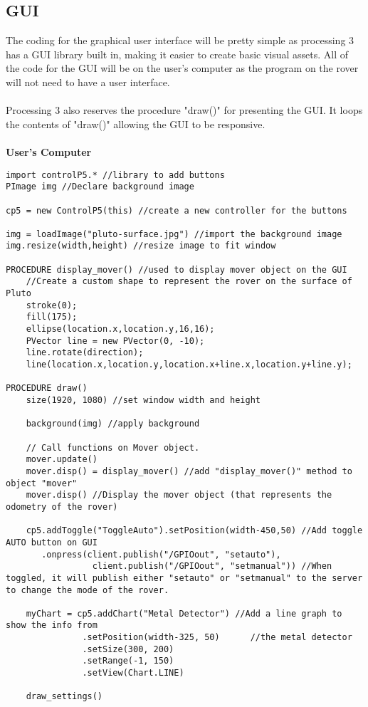 \documentclass[11pt]{report}
\begin{document}
\subsection{GUI}
The coding for the graphical user interface will be pretty simple as processing 3 has a GUI library built in, making it easier to create basic visual assets. All of the code for the GUI will be on the user's computer as the program on the rover will not need to have a user interface. 
\\\\
Processing 3 also reserves the procedure "draw()" for presenting the GUI. It loops the contents of "draw()" allowing the GUI to be responsive.
\\\\
\textbf{User's Computer}
\begin{lstlisting}
import controlP5.* //library to add buttons
PImage img //Declare background image

cp5 = new ControlP5(this) //create a new controller for the buttons

img = loadImage("pluto-surface.jpg") //import the background image
img.resize(width,height) //resize image to fit window

PROCEDURE display_mover() //used to display mover object on the GUI
	//Create a custom shape to represent the rover on the surface of Pluto
	stroke(0);
	fill(175);
	ellipse(location.x,location.y,16,16);
	PVector line = new PVector(0, -10);
	line.rotate(direction);
	line(location.x,location.y,location.x+line.x,location.y+line.y);

PROCEDURE draw()
	size(1920, 1080) //set window width and height
	
	background(img) //apply background
	
	// Call functions on Mover object.
	mover.update()
	mover.disp() = display_mover() //add "display_mover()" method to object "mover"
	mover.disp() //Display the mover object (that represents the odometry of the rover)
	
	cp5.addToggle("ToggleAuto").setPosition(width-450,50) //Add toggle AUTO button on GUI
	   .onpress(client.publish("/GPIOout", "setauto"), 
	             client.publish("/GPIOout", "setmanual")) //When toggled, it will publish either "setauto" or "setmanual" to the server to change the mode of the rover.
	
	myChart = cp5.addChart("Metal Detector") //Add a line graph to show the info from 
               .setPosition(width-325, 50) 		//the metal detector
               .setSize(300, 200)
               .setRange(-1, 150)
               .setView(Chart.LINE)
               
    draw_settings()
\end{lstlisting}
\end{document}
